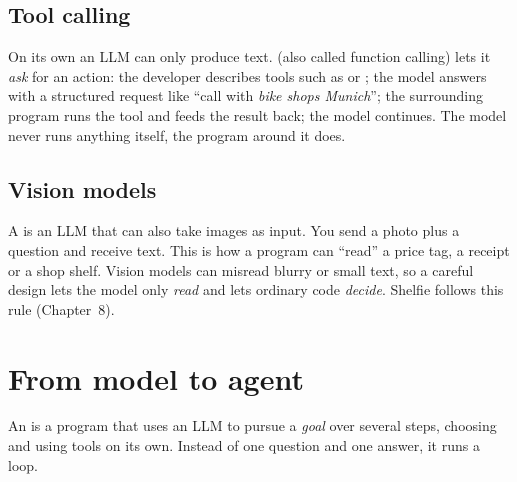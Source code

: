 \subsection{Tool calling}
On its own an LLM can only produce text.  (also called function calling) lets it \emph{ask} for an action: the developer describes tools such as  or ; the model answers with a structured request like ``call  with \emph{bike shops Munich}''; the surrounding program runs the tool and feeds the result back; the model continues. The model never runs anything itself, the program around it does.

\begin{center}
\end{center}

\subsection{Vision models}
A  is an LLM that can also take images as input. You send a photo plus a question and receive text. This is how a program can ``read'' a price tag, a receipt or a shop shelf. Vision models can misread blurry or small text, so a careful design lets the model only \emph{read} and lets ordinary code \emph{decide}. Shelfie follows this rule (Chapter~8).

\section{From model to agent}

An  is a program that uses an LLM to pursue a \emph{goal} over several steps, choosing and using tools on its own. Instead of one question and one answer, it runs a loop.

